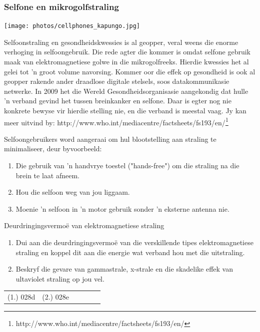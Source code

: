             \subsubsection*{Selfone en mikrogolfstraling}
            \nopagebreak
\begin{minipage}{.5\textwidth}
\texttt{[image: photos/cellphones\_kapungo.jpg]}
\end{minipage}
\begin{minipage}{.5\textwidth}
            \label{m38779*id189654} Selfoonstraling en gesondheidskwessies is al geopper, veral weens die enorme verhoging in selfoongebruik. Die rede agter die kommer is omdat selfone gebruik maak van elektromagnetiese golwe in die mikrogolfreeks. Hierdie kwessies het al gelei tot 'n groot volume navorsing. Kommer oor die effek op gesondheid is ook al geopper rakende ander draadlose digitale stelsels, soos datakommunikasie netwerke. 
In 2009 het die Wereld Gesondheidsorganisasie aangekondig dat hulle 'n verband gevind het tussen breinkanker en selfone. Daar is egter nog nie konkrete bewyse vir hierdie stelling nie, en die verband is meestal vaag. Jy kan meer uitvind by: http://www.who.int/mediacentre/factsheets/fs193/en/\footnote{http://www.who.int/mediacentre/factsheets/fs193/en/}
        \par 
\end{minipage}
        \label{m38779*id189664} Selfoongebruikers word aangeraai om hul blootstelling aan straling te minimaliseer, deur byvoorbeeld:\par 
        \label{m38779*id189668}\begin{enumerate}[noitemsep, label=\textbf{\arabic*}. ] 
            \label{m38779*uid24}\item Die gebruik van 'n handvrye toestel ("hands-free") om die straling na die brein te laat afneem.
\label{m38779*uid25}\item Hou die selfoon weg van jou liggaam.
\label{m38779*uid26}\item Moenie 'n selfoon in 'n motor gebruik sonder 'n eksterne antenna nie. 
\end{enumerate}
        \label{m38779*uid27}
            \begin{exercises}{Deurdringingsvermo\"e van e\-lek\-tro\-mag\-ne\-tie\-se straling}
            \nopagebreak
        \label{m38779*id189729}\begin{enumerate}[noitemsep, label=\textbf{\arabic*}. ] 
            \label{m38779*uid28}\item Dui aan die deurdringingsvermo\"e van die verskillende tipes e\-lek\-tro\-mag\-ne\-tie\-se straling en koppel dit aan die energie wat verband hou met die uitstraling. \newline
\label{m38779*uid29}\item Beskryf die gevare van gammastrale, x-strale en die skadelike effek van ultaviolet straling op jou vel. \newline
\end{enumerate}
    \label{m38779*cid8}
\practiceinfo
 \par \begin{tabular}[h]{cccccc}
 (1.) 028d  &  (2.) 028e  & \end{tabular}
\end{exercises}


